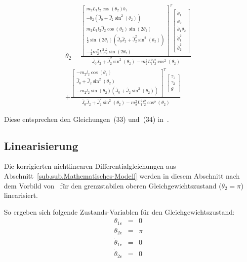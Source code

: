 \begin{multline}
\ddot{\theta}_2 =
\frac{
\begin{bmatrix}
	m_2L_1l_2\cos(\theta_2)b_1 \\ 
	-b_2(\hat{J}_0+\hat{J}_2\sin^2(\theta_2)) \\ 
	m_2L_1l_2\hat{J}_2\cos(\theta_2)\sin(2\theta_2) \\ 
	\frac{1}{2}\sin(2\theta_2)(\hat{J}_0\hat{J}_2+\hat{J}^2_2\sin^2(\theta_2)) \\ 
	-\frac{1}{2}m^2_2L^2_1l^2_2\sin(2\theta_2)
\end{bmatrix}^T
\begin{bmatrix}
	\dot{\theta}_1 \\ 
	\dot{\theta}_2 \\ 
	\dot{\theta}_1\dot{\theta}_2 \\ 
	\dot{\theta}^2_1 \\ 
	\dot{\theta}^2_2
\end{bmatrix} }
{\hat{J}_0\hat{J}_2+\hat{J}^2_2\sin^2(\theta_2)-m^2_2L^2_1l^2_2\cos^2(\theta_2)} \\
+
\frac{
\begin{bmatrix}
	-m_2l_2\cos(\theta_2) \\ 
	\hat{J}_0+\hat{J}_2\sin^2(\theta_2) \\ 
	-m_2l_2\sin(\theta_2)(\hat{J}_0+\hat{J}_2\sin^2(\theta_2))
\end{bmatrix}^T
\begin{bmatrix}
	\tau_1 \\ 
	\tau_2 \\ 
	g
\end{bmatrix} }
{\hat{J}_0\hat{J}_2+\hat{J}^2_2\sin^2(\theta_2)-m^2_2L^2_1l^2_2\cos^2(\theta_2)}
\end{multline}

Diese entsprechen den Gleichungen~(33) und~(34) in~\cite{Cazzolato.2011}.

\subsection{Linearisierung}
\label{sub.sub.Linearisierung}
Die korrigierten nichtlinearen Differentialgleichungen aus Abschnitt~\ref{sub.sub.Mathematisches-Modell} werden in diesem Abschnitt nach dem Vorbild von~\cite{Cazzolato.2011} für den grenz\-stabilen oberen Gleichgewichtszustand ($\theta_2 = \pi$) linearisiert.

So ergeben sich folgende Zustands-Variablen für den Gleichgewichtszustand:
\begin{eqnarray}
\theta_{1e} &=& 0		\nonumber \\
\theta_{2e} &=& \pi	\nonumber \\
\dot{\theta}_{1e} &=& 0		\nonumber \\
\dot{\theta}_{2e} &=& 0	
\end{eqnarray}

